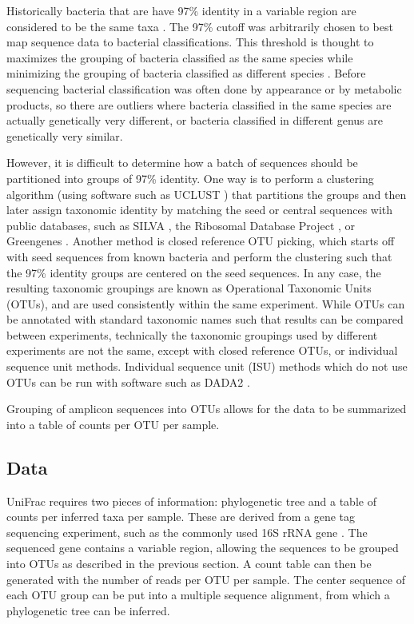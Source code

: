 \documentclass[10pt,letterpaper]{article}
\begin{document}
Historically bacteria that are have 97\% identity in a variable region are considered to be the same taxa \cite{ciccarelli2006toward}. The 97\% cutoff was arbitrarily chosen to best map sequence data to bacterial classifications. This threshold is thought to maximizes the grouping of bacteria classified as the same species while minimizing the grouping of bacteria classified as different species \cite{caporaso2011global}. Before sequencing bacterial classification was often done by appearance or by metabolic products, so there are outliers where bacteria classified in the same species are actually genetically very different, or bacteria classified in different genus are genetically very similar.

However, it is difficult to determine how a batch of sequences should be partitioned into groups of 97\% identity. One way is to perform a clustering algorithm (using software such as UCLUST \cite{edgar2010search}) that partitions the groups and then later assign taxonomic identity by matching the seed or central sequences with public databases, such as SILVA \cite{quast2013silva}, the Ribosomal Database Project \cite{cole2009ribosomal}, or Greengenes \cite{desantis2006greengenes}. Another method is closed reference OTU picking, which starts off with seed sequences from known bacteria and perform the clustering such that the 97\% identity groups are centered on the seed sequences. In any case, the resulting taxonomic groupings are known as Operational Taxonomic Units (OTUs), and are used consistently within the same experiment. While OTUs can be annotated with standard taxonomic names such that results can be compared between experiments, technically the taxonomic groupings used by different experiments are not the same, except with closed reference OTUs, or individual sequence unit methods. Individual sequence unit (ISU) methods which do not use OTUs can be run with software such as DADA2 \cite{callahan2015dada2}.

Grouping of amplicon sequences into OTUs allows for the data to be summarized into a table of counts per OTU per sample.

\subsection{Data}
UniFrac requires two pieces of information: phylogenetic tree and a table of counts per inferred taxa per sample. These are derived from a gene tag sequencing experiment, such as the commonly used 16S rRNA gene \cite{tringe2008renaissance}. The sequenced gene contains a variable region, allowing the sequences to be grouped into OTUs as described in the previous section. A count table can then be generated with the number of reads per OTU per sample. The center sequence of each OTU group can be put into a multiple sequence alignment, from which a phylogenetic tree can be inferred.
\end{document}
